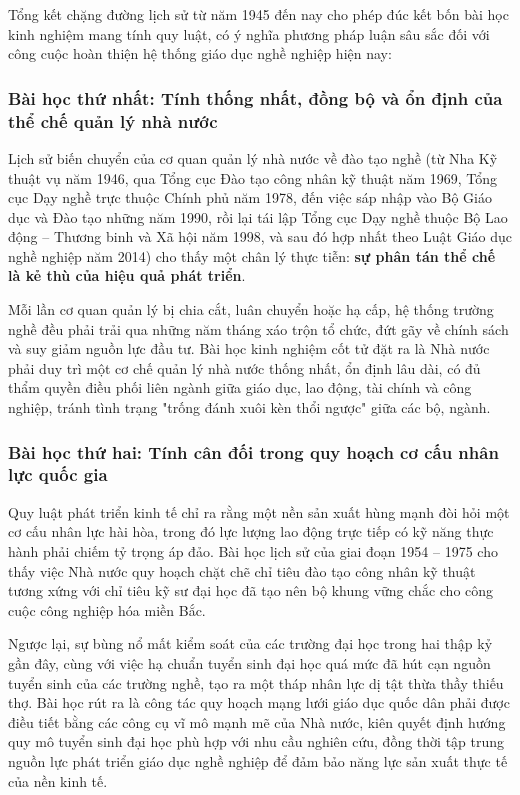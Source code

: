 Tổng kết chặng đường lịch sử từ năm 1945 đến nay cho phép đúc kết bốn bài học kinh nghiệm mang tính quy luật, có ý nghĩa phương pháp luận sâu sắc đối với công cuộc hoàn thiện hệ thống giáo dục nghề nghiệp hiện nay:

\subsubsection{Bài học thứ nhất: Tính thống nhất, đồng bộ và ổn định của thể chế quản lý nhà nước}

Lịch sử biến chuyển của cơ quan quản lý nhà nước về đào tạo nghề (từ Nha Kỹ thuật vụ năm 1946, qua Tổng cục Đào tạo công nhân kỹ thuật năm 1969, Tổng cục Dạy nghề trực thuộc Chính phủ năm 1978, đến việc sáp nhập vào Bộ Giáo dục và Đào tạo những năm 1990, rồi lại tái lập Tổng cục Dạy nghề thuộc Bộ Lao động -- Thương binh và Xã hội năm 1998, và sau đó hợp nhất theo Luật Giáo dục nghề nghiệp năm 2014) cho thấy một chân lý thực tiễn: \textbf{sự phân tán thể chế là kẻ thù của hiệu quả phát triển}. 

Mỗi lần cơ quan quản lý bị chia cắt, luân chuyển hoặc hạ cấp, hệ thống trường nghề đều phải trải qua những năm tháng xáo trộn tổ chức, đứt gãy về chính sách và suy giảm nguồn lực đầu tư. Bài học kinh nghiệm cốt tử đặt ra là Nhà nước phải duy trì một cơ chế quản lý nhà nước thống nhất, ổn định lâu dài, có đủ thẩm quyền điều phối liên ngành giữa giáo dục, lao động, tài chính và công nghiệp, tránh tình trạng "trống đánh xuôi kèn thổi ngược" giữa các bộ, ngành.

\subsubsection{Bài học thứ hai: Tính cân đối trong quy hoạch cơ cấu nhân lực quốc gia}

Quy luật phát triển kinh tế chỉ ra rằng một nền sản xuất hùng mạnh đòi hỏi một cơ cấu nhân lực hài hòa, trong đó lực lượng lao động trực tiếp có kỹ năng thực hành phải chiếm tỷ trọng áp đảo. Bài học lịch sử của giai đoạn 1954 -- 1975 cho thấy việc Nhà nước quy hoạch chặt chẽ chỉ tiêu đào tạo công nhân kỹ thuật tương xứng với chỉ tiêu kỹ sư đại học đã tạo nên bộ khung vững chắc cho công cuộc công nghiệp hóa miền Bắc. 

Ngược lại, sự bùng nổ mất kiểm soát của các trường đại học trong hai thập kỷ gần đây, cùng với việc hạ chuẩn tuyển sinh đại học quá mức đã hút cạn nguồn tuyển sinh của các trường nghề, tạo ra một tháp nhân lực dị tật thừa thầy thiếu thợ. Bài học rút ra là công tác quy hoạch mạng lưới giáo dục quốc dân phải được điều tiết bằng các công cụ vĩ mô mạnh mẽ của Nhà nước, kiên quyết định hướng quy mô tuyển sinh đại học phù hợp với nhu cầu nghiên cứu, đồng thời tập trung nguồn lực phát triển giáo dục nghề nghiệp để đảm bảo năng lực sản xuất thực tế của nền kinh tế.

